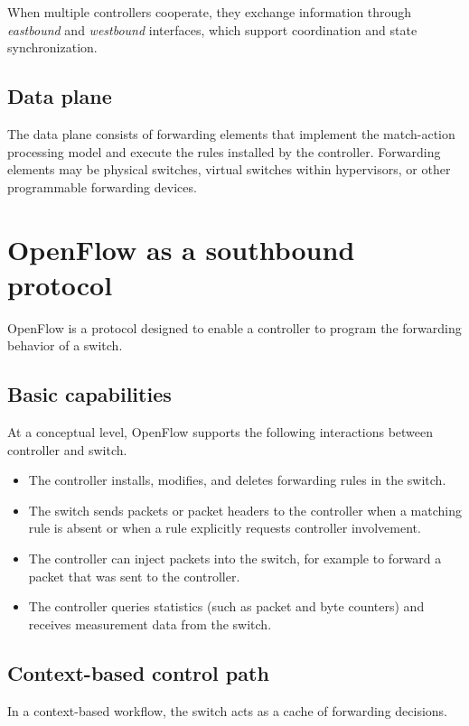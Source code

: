 \documentclass[11pt,a4paper,openany]{report}
\begin{document}
When multiple controllers cooperate, they exchange information through \emph{eastbound} and \emph{westbound} interfaces, which support coordination and state synchronization.

\subsection{Data plane}

The data plane consists of forwarding elements that implement the match-action processing model and execute the rules installed by the controller. Forwarding elements may be physical switches, virtual switches within hypervisors, or other programmable forwarding devices.

\section{OpenFlow as a southbound protocol}

OpenFlow is a protocol designed to enable a controller to program the forwarding behavior of a switch.

\subsection{Basic capabilities}

At a conceptual level, OpenFlow supports the following interactions between controller and switch.

\begin{itemize}
\item The controller installs, modifies, and deletes forwarding rules in the switch.
\item The switch sends packets or packet headers to the controller when a matching rule is absent or when a rule explicitly requests controller involvement.
\item The controller can inject packets into the switch, for example to forward a packet that was sent to the controller.
\item The controller queries statistics (such as packet and byte counters) and receives measurement data from the switch.
\end{itemize}

\subsection{Context-based control path}

In a context-based workflow, the switch acts as a cache of forwarding decisions.
\end{document}
